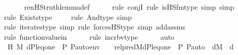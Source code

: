 \begin{isabellebody}
\ \ \ \ \isamarkupfalse%
\ ren{\isacharunderscore}{\kern0pt}HS{\isacharunderscore}{\kern0pt}truth{\isacharunderscore}{\kern0pt}lemma{\isacharunderscore}{\kern0pt}def\ \isanewline
\ \ \ \ \isamarkupfalse%
{\isacharparenleft}{\kern0pt}rule\ conjI{\isacharcomma}{\kern0pt}\ rule\ is{\isacharunderscore}{\kern0pt}HS{\isacharunderscore}{\kern0pt}fm{\isacharunderscore}{\kern0pt}type{\isacharcomma}{\kern0pt}\ simp{\isacharcomma}{\kern0pt}\ simp{\isacharparenright}{\kern0pt}\isanewline
\ \ \ \ \isamarkupfalse%
{\isacharparenleft}{\kern0pt}rule\ Exists{\isacharunderscore}{\kern0pt}type{\isacharparenright}{\kern0pt}{\isacharplus}{\kern0pt}\isanewline
\ \ \ \ \isamarkupfalse%
{\isacharparenleft}{\kern0pt}rule\ And{\isacharunderscore}{\kern0pt}type{\isacharcomma}{\kern0pt}\ simp{\isacharparenright}{\kern0pt}{\isacharplus}{\kern0pt}\isanewline
\ \ \ \ \isamarkupfalse%
{\isacharparenleft}{\kern0pt}rule\ iterates{\isacharunderscore}{\kern0pt}type{\isacharcomma}{\kern0pt}\ simp{\isacharcomma}{\kern0pt}\ rule\ forcesHS{\isacharunderscore}{\kern0pt}type{\isacharcomma}{\kern0pt}\ simp\ add{\isacharcolon}{\kern0pt}assms{\isacharparenright}{\kern0pt}\isanewline
\ \ \ \ \isamarkupfalse%
{\isacharparenleft}{\kern0pt}rule\ function{\isacharunderscore}{\kern0pt}value{\isacharunderscore}{\kern0pt}in{\isacharparenright}{\kern0pt}\isanewline
\ \ \ \ \ \isamarkupfalse%
{\isacharparenleft}{\kern0pt}rule\ incr{\isacharunderscore}{\kern0pt}bv{\isacharunderscore}{\kern0pt}type{\isacharparenright}{\kern0pt}\isanewline
\ \ \ \ \isamarkupfalse%
\ auto\isanewline
\ \ \isamarkupfalse%
\isanewline
\ \ \isamarkupfalse%
\ H{\isacharcolon}{\kern0pt}\ {\isachardoublequoteopen}{\isacharparenleft}{\kern0pt}M{\isacharcomma}{\kern0pt}\ {\isacharbrackleft}{\kern0pt}d{\isacharcomma}{\kern0pt}P{\isacharcomma}{\kern0pt}leq{\isacharcomma}{\kern0pt}one{\isacharcomma}{\kern0pt}{\isasymlangle}{\isasymF}{\isacharcomma}{\kern0pt}\ {\isasymG}{\isacharcomma}{\kern0pt}\ P{\isacharcomma}{\kern0pt}\ P{\isacharunderscore}{\kern0pt}auto{\isasymrangle}{\isacharbrackright}{\kern0pt}{\isacharat}{\kern0pt}env\ {\isasymTurnstile}\ {\isacharquery}{\kern0pt}{\isasympsi}{\isacharparenright}{\kern0pt}\ {\isasymlongleftrightarrow}\ {\isacharquery}{\kern0pt}rel{\isacharunderscore}{\kern0pt}pred{\isacharparenleft}{\kern0pt}M{\isacharcomma}{\kern0pt}d{\isacharcomma}{\kern0pt}P{\isacharcomma}{\kern0pt}leq{\isacharcomma}{\kern0pt}one{\isacharcomma}{\kern0pt}{\isasymlangle}{\isasymF}{\isacharcomma}{\kern0pt}\ {\isasymG}{\isacharcomma}{\kern0pt}\ P{\isacharcomma}{\kern0pt}\ P{\isacharunderscore}{\kern0pt}auto{\isasymrangle}{\isacharparenright}{\kern0pt}{\isachardoublequoteclose}\ \ {\isachardoublequoteopen}d{\isasymin}M{\isachardoublequoteclose}\ \ d\isanewline

\end{isabellebody}
